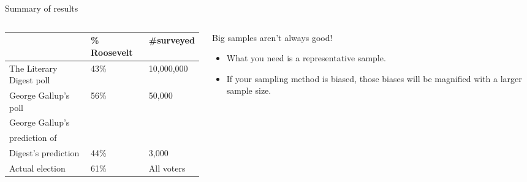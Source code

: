 \documentclass[aspectratio=169]{../latex_main/tntbeamer}  %
\begin{document}
	\begin{frame}{Summary of results}
	    \begin{columns}
	        \begin{column}{.6\textwidth}
	            \begin{tabular}{|l|l|l|}
	                \hline
	                 & \% Roosevelt & \#surveyed  \\
	               \hline
	               The Literary Digest poll  & 43\%  & 10,000,000\\
	               \hline
	               George Gallup’s poll & 56\% & 50,000\\
	               \hline
	               George Gallup’s\\ prediction of\\ Digest’s prediction & 44\% & 3,000\\
	               \hline
	               Actual election & 61\% & All voters\\
	               \hline
	            \end{tabular}
	        \end{column}
	        
	        \begin{column}{.4\textwidth}
	            Big samples aren’t always good!
                \begin{itemize}
                    \item What you need is a representative sample. 
                    \item If your sampling method is biased, those biases will be magnified with a larger sample size.
                \end{itemize}
	        \end{column}
	        
	    \end{columns}
	    
	\end{frame}
	
\end{document}

